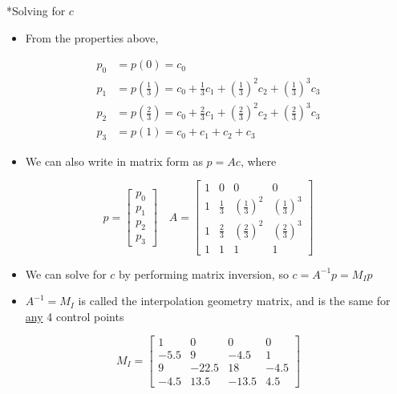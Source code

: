 \documentclass[a4paper]{article}
\makeatletter
\renewcommand{\subsection}{
  \@startsection{subsection}{2}{0pt}{1ex}{1.2ex} {\raggedleft\normalfont\normalsize\bfseries\fbox}}
\makeatother
\begin{document}
\begin{multicols*}{3}
  \subsection*{Solving for $c$}
    \begin{itemize}[leftmargin=*]
      \item From the properties above,
    \end{itemize}
    \vspace{-0.3cm}
    \begin{align*}
      p_0 &= p(0) = c_0 \\
      p_1 &= p \left( \frac{1}{3} \right) = c_0 + \frac{1}{3} c_1 + \left( \frac{1}{3} \right)^2 c_2 + \left( \frac{1}{3} \right)^3 c_3 \\
      p_2 &= p \left( \frac{2}{3} \right) = c_0 + \frac{2}{3} c_1 + \left( \frac{2}{3} \right)^2 c_2 + \left( \frac{2}{3} \right)^3 c_3 \\
      p_3 &= p(1) = c_0 + c_1 + c_2 + c_3
    \end{align*}
    \begin{itemize}[leftmargin=*]
      \item We can also write in matrix form as $p = Ac$, where
    \end{itemize}
    \[
      p = \begin{bmatrix} p_0 \\ p_1 \\ p_2 \\ p_3 \end{bmatrix} \quad
      A = \begin{bmatrix}
        1 & 0 & 0 & 0 \\
        1 & \frac{1}{3} & \left( \frac{1}{3} \right)^2 & \left( \frac{1}{3} \right)^3 \\
        1 & \frac{2}{3} & \left( \frac{2}{3} \right)^2 & \left( \frac{2}{3} \right)^3 \\
        1 & 1 & 1 & 1
      \end{bmatrix}
    \]
    \begin{itemize}[leftmargin=*]
      \item We can solve for $c$ by performing matrix inversion, so $c = A^{-1} p = M_I p$
      \item $A^{-1} = M_I$ is called the interpolation geometry matrix, and is the same for \uline{any} 4 control points
    \end{itemize}
    \[
      M_I = \begin{bmatrix}
        1 & 0 & 0 & 0 \\
        -5.5 & 9 & -4.5 & 1 \\
        9 & -22.5 & 18 & -4.5 \\
        -4.5 & 13.5 & -13.5 & 4.5
      \end{bmatrix}
    \]

\end{multicols*}
\end{document}
